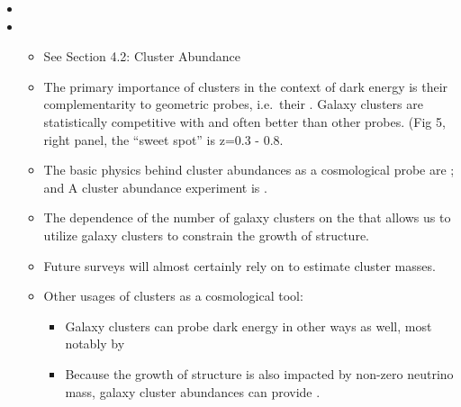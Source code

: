 \documentclass[letterpaper,10pt,english]{sphinxmanual}
\begin{document}
\begin{itemize}
\item {} 

\item {} 
\begin{itemize}
\item {} 
See Section 4.2: Cluster Abundance

\item {} 
The primary importance of clusters in the context of dark energy
is their complementarity to geometric probes, i.e. their . Galaxy clusters are
statistically competitive with and often better than other probes.
(Fig 5, right panel, the “sweet spot” is z=0.3 - 0.8.

\item {} 
The basic physics behind cluster abundances as a cosmological
probe are ; and A cluster abundance
experiment is .

\item {} 
The dependence of the number of galaxy clusters on the  that allows us to utilize galaxy
clusters to constrain the growth of structure.

\item {} 
Future surveys will almost certainly rely on  to estimate cluster masses.

\item {} 
Other usages of clusters as a cosmological tool:
\begin{itemize}
\item {} 
Galaxy clusters can probe dark energy in other ways as well,
most notably by 

\item {} 
Because the growth of structure is also impacted by non-zero
neutrino mass, galaxy cluster abundances can provide
.


\end{itemize}
\end{itemize}
\end{itemize}
\end{document}
